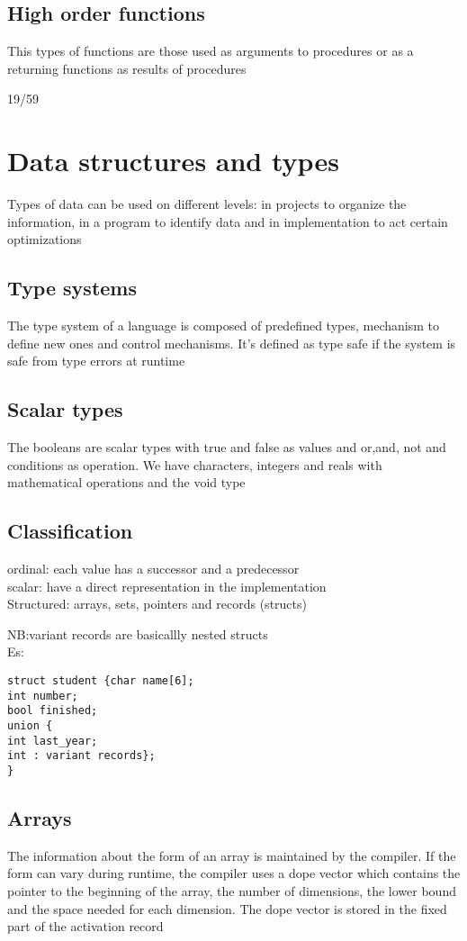 \documentclass[12pt, a4paper]{article}
\begin{document}
\subsection{High order functions}
This types of functions are those used as arguments to procedures or as a returning functions as results of procedures

19/59

\newpage
\section{Data structures and types}
Types of data can be used on different levels: in projects to organize the information, in a program to identify data
and in implementation to act certain optimizations

\subsection{Type systems}
The type system of a language is composed of predefined types, mechanism to define new ones and control mechanisms.
It's defined as type safe if the system is safe from type errors at runtime

\subsection{Scalar types}
The booleans are scalar types with true and false as values and or,and, not and conditions as operation. We have 
characters, integers and reals with mathematical operations and the void type

\subsection{Classification}
ordinal: each value has a successor and a predecessor\\
scalar: have a direct representation in the implementation\\
Structured: arrays, sets, pointers and records (structs)

NB:variant records are basicallly nested structs\\Es:
\begin{lstlisting}
struct student {char name[6];
int number;
bool finished;
union {
int last_year;
int : variant records};
}
\end{lstlisting}

\subsection{Arrays}
The information about the form of an array is maintained by the compiler. If the form can vary during runtime, the 
compiler uses a dope vector which contains the pointer to the beginning of the array, the number of dimensions,
the lower bound and the space needed for each dimension. The dope vector is stored in the fixed part of the activation
record
\end{document}
